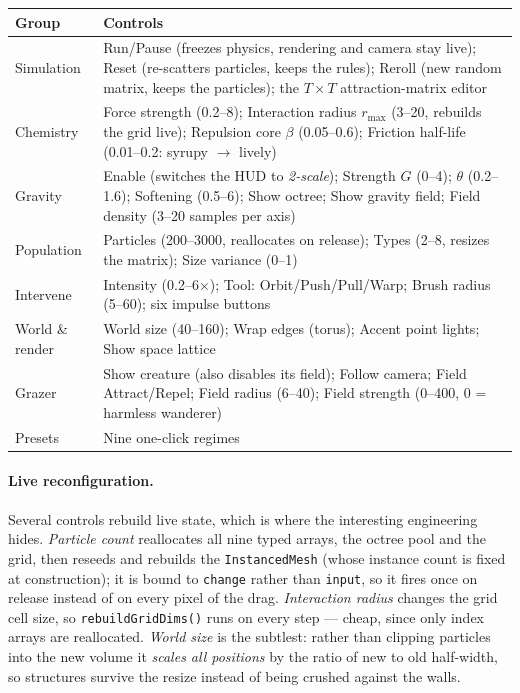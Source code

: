 \documentclass[10pt,a4paper]{article}
\newcommand{\code}[1]{\texttt{\small #1}}
\begin{document}
\begin{center}
\small
\begin{tabular}{@{}p{2.5cm}p{13.5cm}@{}}
\toprule
\textbf{Group} & \textbf{Controls}\\
\midrule
Simulation   & Run/Pause (freezes physics, rendering and camera stay live); Reset (re-scatters particles, keeps the rules); Reroll (new random matrix, keeps the particles); the $T\times T$ attraction-matrix editor\\
Chemistry    & Force strength (0.2--8); Interaction radius $r_{\max}$ (3--20, rebuilds the grid live); Repulsion core $\beta$ (0.05--0.6); Friction half-life (0.01--0.2: syrupy $\to$ lively)\\
Gravity      & Enable (switches the HUD to \emph{2-scale}); Strength $G$ (0--4); $\theta$ (0.2--1.6); Softening (0.5--6); Show octree; Show gravity field; Field density (3--20 samples per axis)\\
Population   & Particles (200--3000, reallocates on release); Types (2--8, resizes the matrix); Size variance (0--1)\\
Intervene    & Intensity (0.2--6$\times$); Tool: Orbit/Push/Pull/Warp; Brush radius (5--60); six impulse buttons\\
World \& render & World size (40--160); Wrap edges (torus); Accent point lights; Show space lattice\\
Grazer       & Show creature (also disables its field); Follow camera; Field Attract/Repel; Field radius (6--40); Field strength (0--400, 0 = harmless wanderer)\\
Presets      & Nine one-click regimes\\
\bottomrule
\end{tabular}
\end{center}

\paragraph{Live reconfiguration.} Several controls rebuild live state, which is where the interesting
engineering hides. \emph{Particle count} reallocates all nine typed arrays, the octree pool and the grid,
then reseeds and rebuilds the \code{InstancedMesh} (whose instance count is fixed at construction); it is
bound to \code{change} rather than \code{input}, so it fires once on release instead of on every pixel of
the drag. \emph{Interaction radius} changes the grid cell size, so \code{rebuildGridDims()} runs on every
step --- cheap, since only index arrays are reallocated. \emph{World size} is the subtlest: rather than
clipping particles into the new volume it \emph{scales all positions} by the ratio of new to old half-width,
so structures survive the resize instead of being crushed against the walls.
\end{document}
